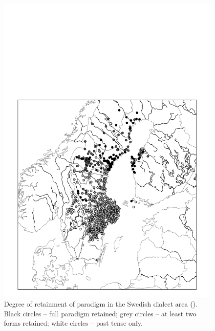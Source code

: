 \begin{figure}[h]
\includegraphics[height=.5\textheight]{figures/35_RetainmentofVarda}
\caption{Degree of retainment of  paradigm in the Swedish dialect area (\citet{Markey1969}). Black circles – full paradigm retained; grey circles – at least two forms retained; white circles – past tense only. }
\label{map:31}
\end{figure}


